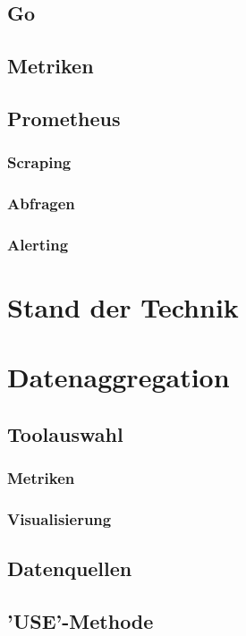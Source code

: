 \documentclass[a4paper,12pt]{scrartcl}
\begin{document}
\subsection{Go}
\subsection{Metriken}
\subsection{Prometheus}
\subsubsection{Scraping}
\subsubsection{Abfragen}
\subsubsection{Alerting}

\section{Stand der Technik}

\section{Datenaggregation}
\subsection{Toolauswahl}
\subsubsection{Metriken}
\subsubsection{Visualisierung}
\subsection{Datenquellen}
\subsection{'USE'-Methode}
\end{document}

